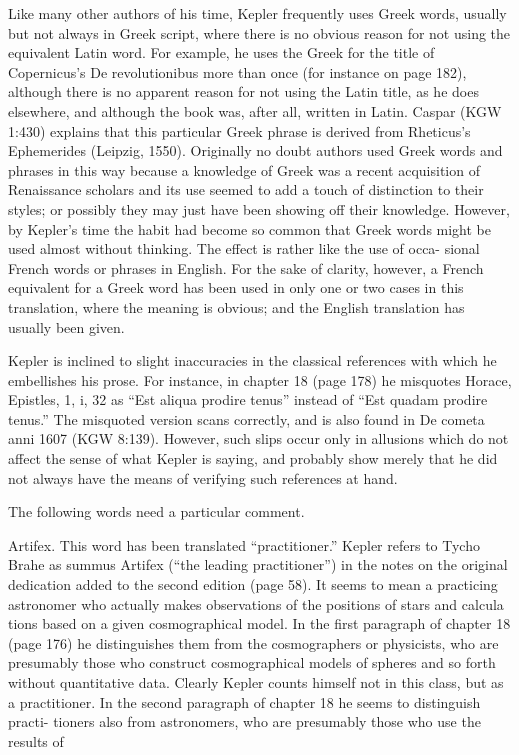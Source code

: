 \documentclass{article}
\begin{document}
Like many other authors of his time, Kepler frequently uses Greek words,
usually but not always in Greek script, where there is no obvious reason for not
using the equivalent Latin word. For example, he uses the Greek for the title of
Copernicus’s De revolutionibus more than once (for instance on page 182),
although there is no apparent reason for not using the Latin title, as he does
elsewhere, and although the book was, after all, written in Latin. Caspar (KGW
1:430) explains that this particular Greek phrase is derived from Rheticus’s
Ephemerides (Leipzig, 1550). Originally no doubt authors used Greek words and
phrases in this way because a knowledge of Greek was a recent acquisition of
Renaissance scholars and its use seemed to add a touch of distinction to their
styles; or possibly they may just have been showing off their knowledge.
However, by Kepler’s time the habit had become so common that Greek words
might be used almost without thinking. The effect is rather like the use of occa-
sional French words or phrases in English. For the sake of clarity, however, a
French equivalent for a Greek word has been used in only one or two cases in this
translation, where the meaning is obvious; and the English translation has usually
been given.

Kepler is inclined to slight inaccuracies in the classical references with which he
embellishes his prose. For instance, in chapter 18 (page 178) he misquotes
Horace, Epistles, 1, i, 32 as “Est aliqua prodire tenus” instead of “Est quadam
prodire tenus.” The misquoted version scans correctly, and is also found in De
cometa anni 1607 (KGW 8:139). However, such slips occur only in allusions
which do not affect the sense of what Kepler is saying, and probably show merely
that he did not always have the means of verifying such references at hand.

The following words need a particular comment.

Artifex. This word has been translated “practitioner.” Kepler refers to Tycho
Brahe as summus Artifex (“the leading practitioner”) in the notes on the original
dedication added to the second edition (page 58). It seems to mean a practicing
astronomer who actually makes observations of the positions of stars and calcula
tions based on a given cosmographical model. In the first paragraph of chapter 18
(page 176) he distinguishes them from the cosmographers or physicists, who are
presumably those who construct cosmographical models of spheres and so forth
without quantitative data. Clearly Kepler counts himself not in this class, but as a
practitioner. In the second paragraph of chapter 18 he seems to distinguish practi-
tioners also from astronomers, who are presumably those who use the results of
\end{document}
